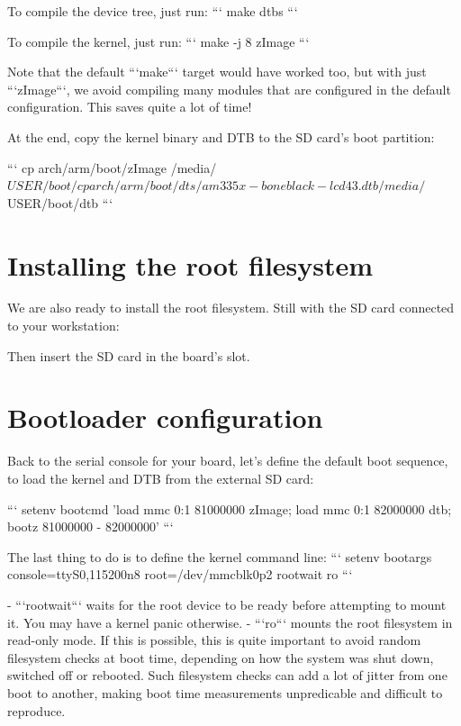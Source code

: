 To compile the device tree, just run:
```
make dtbs
```

To compile the kernel, just run:
```
make -j 8 zImage
```

Note that the default ```make``` target would have worked too, but with
just ```zImage```, we avoid compiling many modules that are configured
in the default configuration. This saves quite a lot of time!

At the end, copy the kernel binary and DTB to the SD card's boot
partition:

```
cp arch/arm/boot/zImage /media/$USER/boot/
cp arch/arm/boot/dts/am335x-boneblack-lcd43.dtb /media/$USER/boot/dtb
```

\section{Installing the root filesystem}

We are also ready to install the root filesystem. Still with the SD card
connected to your workstation:


Then insert the SD card in the board's slot.

\section{Bootloader configuration}

Back to the serial console for your board, let's define the default boot
sequence, to load the kernel and DTB from the external SD card:

{\footnotesize
```
setenv bootcmd 'load mmc 0:1 81000000 zImage; load mmc 0:1 82000000 dtb; bootz 81000000 - 82000000'
```
}

{\footnotesize
The last thing to do is to define the kernel command line:
```
setenv bootargs console=ttyS0,115200n8 root=/dev/mmcblk0p2 rootwait ro
```
}

 -  ```rootwait``` waits for the root device to be ready before
attempting to mount it. You may have a kernel panic otherwise.
 -  ```ro``` mounts the root filesystem in read-only mode.
If this is possible, this is quite important to avoid random
filesystem checks at boot time, depending on how the system was shut
down, switched off or rebooted. Such filesystem checks can add a lot
of jitter from one boot to another, making boot time measurements
unpredicable and difficult to reproduce.

